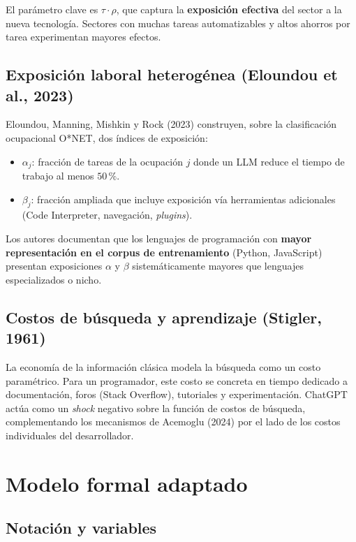 \documentclass[11pt,a4paper]{article}
\theoremstyle{definition}
\begin{document}
El parámetro clave es $\tau \cdot \rho$, que captura la \textbf{exposición efectiva} del sector a la nueva tecnología. Sectores con muchas tareas automatizables y altos ahorros por tarea experimentan mayores efectos.

\subsection{Exposición laboral heterogénea (Eloundou et al., 2023)}

Eloundou, Manning, Mishkin y Rock (2023) construyen, sobre la clasificación ocupacional O*NET, dos índices de exposición:
\begin{itemize}[leftmargin=*]
  \item $\alpha_j$: fracción de tareas de la ocupación $j$ donde un LLM reduce el tiempo de trabajo al menos $50\,\%$.
  \item $\beta_j$: fracción ampliada que incluye exposición vía herramientas adicionales (Code Interpreter, navegación, \textit{plugins}).
\end{itemize}
Los autores documentan que los lenguajes de programación con \textbf{mayor representación en el corpus de entrenamiento} (Python, JavaScript) presentan exposiciones $\alpha$ y $\beta$ sistemáticamente mayores que lenguajes especializados o nicho.

\subsection{Costos de búsqueda y aprendizaje (Stigler, 1961)}

La economía de la información clásica modela la búsqueda como un costo paramétrico. Para un programador, este costo se concreta en tiempo dedicado a documentación, foros (Stack Overflow), tutoriales y experimentación. ChatGPT actúa como un \textit{shock} negativo sobre la función de costos de búsqueda, complementando los mecanismos de Acemoglu (2024) por el lado de los costos individuales del desarrollador.

\section{Modelo formal adaptado}
\label{sec:modelo}

\subsection{Notación y variables}
\end{document}
